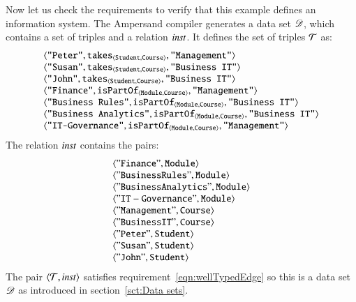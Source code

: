\documentclass{elsarticle}
\begin{document}
   Now let us check the requirements to verify that this example defines an information system.
   The Ampersand compiler generates a data set $\mathscr{D}$, which contains a set of triples and a relation $\mathbin{\text{\it inst\/}}$.
   It defines the set of triples $\mathcal{T}$ as:
\[\begin{array}[t]{l}
   \langle{\text{\tt "Peter"}},{\text{\it \text{\tt takes}\/}_{\langle{\text{\tt Student}},{\text{\tt Course}}\rangle}},{\text{\tt "Management"}}\rangle\\
   \langle{\text{\tt "Susan"}},{\text{\it \text{\tt takes}\/}_{\langle{\text{\tt Student}},{\text{\tt Course}}\rangle}},{\text{\tt "Business IT"}}\rangle\\
   \langle{\text{\tt "John"}},{\text{\it \text{\tt takes}\/}_{\langle{\text{\tt Student}},{\text{\tt Course}}\rangle}},{\text{\tt "Business IT"}}\rangle\\
   \langle{\text{\tt "Finance"}},{\text{\it \text{\tt isPartOf}\/}_{\langle{\text{\tt Module}},{\text{\tt Course}}\rangle}},{\text{\tt "Management"}}\rangle\\
   \langle{\text{\tt "Business Rules"}},{\text{\it \text{\tt isPartOf}\/}_{\langle{\text{\tt Module}},{\text{\tt Course}}\rangle}},{\text{\tt "Business IT"}}\rangle\\
   \langle{\text{\tt "Business Analytics"}},{\text{\it \text{\tt isPartOf}\/}_{\langle{\text{\tt Module}},{\text{\tt Course}}\rangle}},{\text{\tt "Business IT"}}\rangle\\
   \langle{\text{\tt "IT-Governance"}},{\text{\it \text{\tt isPartOf}\/}_{\langle{\text{\tt Module}},{\text{\tt Course}}\rangle}},{\text{\tt "Management"}}\rangle
\end{array}\]
The relation $\mathbin{\text{\it inst\/}}$ contains the pairs:
\[\begin{array}{l}
   \langle{\tt "Finance"},{\tt Module}\rangle\\
   \langle{\tt "Business Rules"},{\tt Module}\rangle\\
   \langle{\tt "Business Analytics"},{\tt Module}\rangle\\
   \langle{\tt "IT-Governance"},{\tt Module}\rangle\\
   \langle{\tt "Management"},{\tt Course}\rangle\\
   \langle{\tt "Business IT"},{\tt Course}\rangle\\
   \langle{\tt "Peter"},{\tt Student}\rangle\\
   \langle{\tt "Susan"},{\tt Student}\rangle\\
   \langle{\tt "John"},{\tt Student}\rangle
\end{array}\]
   The pair $\langle{\mathcal{T}},{\mathbin{\text{\it inst\/}}}\rangle$ satisfies requirement~\ref{eqn:wellTypedEdge} so this is a data set $\mathscr{D}$ as introduced in section~\ref{sct:Data sets}.
\end{document}
